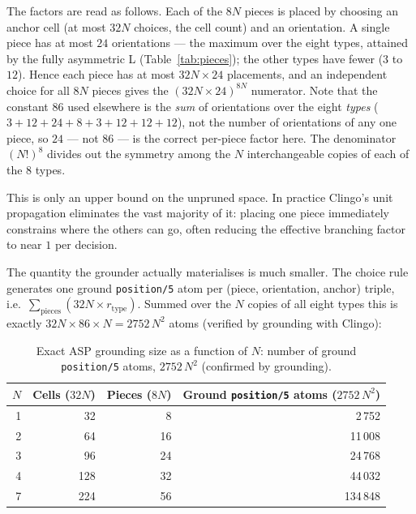 \documentclass[a4paper,UKenglish,cleveref,autoref]{lipics-v2021}
\begin{document}
The factors are read as follows.  Each of the $8N$ pieces is placed by choosing
an anchor cell (at most $32N$ choices, the cell count) and an orientation.  A
single piece has at most $24$ orientations --- the maximum over the eight types,
attained by the fully asymmetric L (Table~\ref{tab:pieces}); the other types
have fewer ($3$ to $12$).  Hence each piece has at most $32N \times 24$
placements, and an independent choice for all $8N$ pieces gives the
$(32N \times 24)^{8N}$ numerator.  Note that the constant $86$ used elsewhere is
the \emph{sum} of orientations over the eight \emph{types}
($3\!+\!12\!+\!24\!+\!8\!+\!3\!+\!12\!+\!12\!+\!12$), not the number of
orientations of any one piece, so $24$ --- not $86$ --- is the correct per-piece
factor here.  The denominator $(N!)^{8}$ divides out the symmetry among the $N$
interchangeable copies of each of the $8$ types.

This is only an upper bound on the unpruned space.  In practice Clingo's unit
propagation eliminates the vast majority of it: placing one piece immediately
constrains where the others can go, often reducing the effective branching
factor to near $1$ per decision.

The quantity the grounder actually materialises is much smaller.  The choice
rule generates one ground \texttt{position/5} atom per (piece, orientation,
anchor) triple, i.e.\ $\sum_{\text{pieces}} (32N \times r_{\text{type}})$.
Summed over the $N$ copies of all eight types this is exactly
$32N \times 86 \times N = 2752\,N^{2}$ atoms (verified by grounding with Clingo):

\begin{table}[htbp]
\centering
\caption{Exact ASP grounding size as a function of $N$: number of ground
         \texttt{position/5} atoms, $2752\,N^{2}$ (confirmed by grounding).}
\label{tab:ground}
\renewcommand{\arraystretch}{1.2}
\begin{tabular}{@{}rrrr@{}}
  \toprule
  $N$ & Cells ($32N$) & Pieces ($8N$) & Ground \texttt{position/5} atoms ($2752\,N^{2}$) \\
  \midrule
  1 &  32 &  8 &     2\,752 \\
  2 &  64 & 16 &    11\,008 \\
  3 &  96 & 24 &    24\,768 \\
  4 & 128 & 32 &    44\,032 \\
  7 & 224 & 56 &   134\,848 \\
  \bottomrule
\end{tabular}
\end{table}
\end{document}
